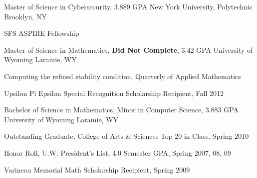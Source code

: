 


\begin{cventries}

\cventry
{Master of Science in Cybersecurity, 3.889 GPA} %
{New York University, Polytechnic} %
{Brooklyn, NY} %
{} %
{
\begin{cvitems}
\item {SFS ASPIRE Fellowship}
\end{cvitems}
}

\cventry
{Master of Science in Mathematics, \textbf{Did Not Complete}, 3.42 GPA} %
{University of Wyoming} %
{Laramie, WY} %
{} %
{
\begin{cvitems}
\item{Computing the refined stability condition, Quarterly of Applied Mathematics}
\item {Upsilon Pi Epsilon Special Recognition Scholarship Recipient, Fall 2012}
\end{cvitems}
}

\cventry
{Bachelor of Science in Mathematics, Minor in Computer Science, 3.883 GPA} %
{University of Wyoming} %
{Laramie, WY} %
{} %
{
\begin{cvitems}
    \item {Outstanding Graduate, College of Arts \& Sciences Top 20 in Class, Spring 2010}
\begin{displaySection}
    \item {Honor Roll, U.W. President’s List, 4.0 Semester GPA, Spring 2007, 08, 09}
    \item {Varineau Memorial Math Scholarship Recipient, Spring 2009}
\end{displaySection}
\end{cvitems}
}


\end{cventries}